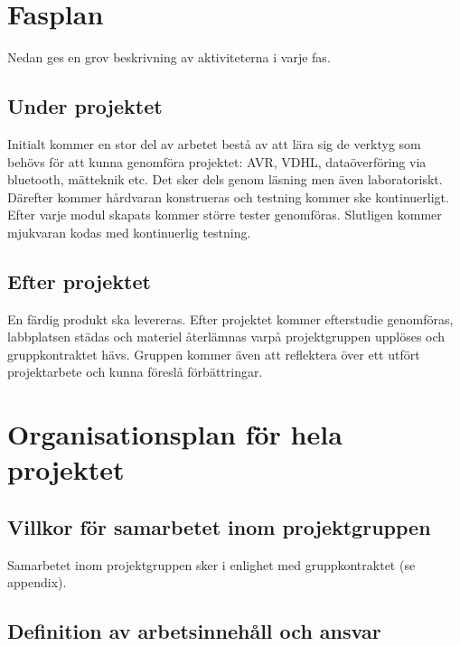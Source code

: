 \documentclass[11pt]{article}
\begin{document}
\begin{flushleft}
\section{Fasplan}
Nedan ges en grov beskrivning av aktiviteterna i varje fas.
\subsection{Under projektet}
Initialt kommer en stor del av arbetet bestå av att lära sig de verktyg som behövs för att kunna genomföra projektet: AVR, VDHL, dataöverföring via bluetooth, mätteknik etc. Det sker dels genom läsning men även laboratoriskt. Därefter kommer hårdvaran konstrueras och testning kommer ske kontinuerligt. Efter varje modul skapats kommer större tester genomföras. Slutligen kommer mjukvaran kodas med kontinuerlig testning.

\subsection{Efter projektet}
En färdig produkt ska levereras. Efter projektet kommer efterstudie genomföras, labbplatsen städas och materiel återlämnas varpå projektgruppen upplöses och gruppkontraktet hävs. Gruppen kommer även att reflektera över ett utfört projektarbete och kunna föreslå förbättringar.
\pagebreak

\section{Organisationsplan för hela projektet} 

\subsection{Villkor för samarbetet inom projektgruppen}
Samarbetet inom projektgruppen sker i enlighet med gruppkontraktet (se appendix).

\subsection{Definition av arbetsinnehåll och ansvar}


\end{flushleft}
\end{document}
